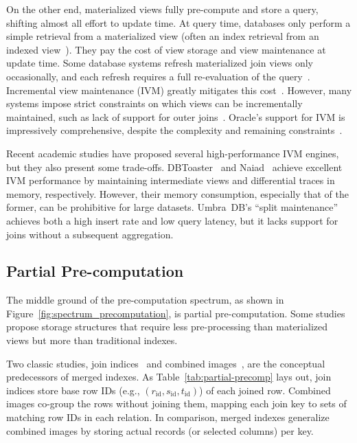 \documentclass[sigconf, pdfa, nonacm]{acmart}
\begin{document}
On the other end, materialized views fully pre-compute and store a query, shifting almost all effort to update time. 
At query time, databases only perform a simple retrieval from a materialized view (often an index retrieval from an indexed view~\cite{indexedviews}).
They pay the cost of view storage and view maintenance at update time.
Some database systems refresh materialized join views only occasionally, and each refresh requires a full re-evaluation of the query~\cite{ibm2024mqts, postgresql2024incremental}.
Incremental view maintenance (IVM) greatly mitigates this cost~\cite{gupta1995maintenance,Zhuge1995ViewMaintenance,Blakeley1990PerformanceAnalysis,GUPTAchangetable,mumick1997maintenance,larson2007outerjoin}.
However, many systems impose strict constraints on which views can be incrementally maintained, such as lack of support for outer joins~\cite{mysql2024viewupdatability,indexedviews,databricks2018stream}.
Oracle's support for IVM is impressively comprehensive, despite the complexity and remaining constraints~\cite{oracle2024mvrefresh}.

\begin{sloppypar}
Recent academic studies have proposed several high-performance IVM engines, but they also present some trade-offs.
DBToaster~\cite{dbtoaster, f-ivm, dbtoasterFK} and Naiad~\cite{mcsherry2013differentialdataflow,budiu2025dbsp} achieve excellent IVM performance by maintaining intermediate views and differential traces in memory, respectively.
However, their memory consumption, especially that of the former, can be prohibitive for large datasets.
Umbra~DB's ``split maintenance''~\cite{umbra20} achieves both a high insert rate and low query latency, but it lacks support for joins without a subsequent aggregation.
\end{sloppypar}

\subsection{Partial Pre-computation}\label{subsec:partial-precomp}

The middle ground of the pre-computation spectrum, as shown in Figure~\ref{fig:spectrum_precomputation}, is partial pre-computation. Some studies propose storage structures that require less pre-processing than materialized views but more than traditional indexes.

\begin{sloppypar}
Two classic studies, join indices~\cite{oneil1995joinindex,valduriez87joinindex} and combined images~\cite{haerder1978combined}, are the conceptual predecessors of merged indexes.
As Table~\ref{tab:partial-precomp} lays out, join indices store base row IDs (e.g., \( (r_\text{id}, s_\text{id}, t_\text{id}) \)) of each joined row.
Combined images co-group the rows without joining them, mapping each join key to sets of matching row IDs in each relation.
In comparison, merged indexes generalize combined images by storing actual records (or selected columns) per key.
\end{sloppypar}
\end{document}
